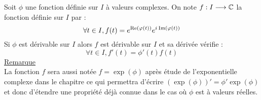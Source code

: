 \begin{appl}
	Soit \(\phi\) une fonction définie sur \(I\) à valeurs complexes.
	On note \(f : I \longrightarrow \mathbb{C}\) la fonction définie sur \(I\) par :
	\[\forall t \in I, f(t) = e^{\operatorname{Re}\left(\varphi(t)\right)}e^{i\mkern1mu\operatorname{Im}\left(\varphi(t)\right)}\]
	Si \(\phi\) est dérivable sur \(I\) alors \(f\) est dérivable sur \(I\) et sa dérivée vérifie :
	\[\forall t \in I,f'(t) = \phi '(t)f(t) \]
	\underline{Remarque} \\
	La fonction \(f\) sera aussi notée \(f = \exp(\phi)\) après étude de l’exponentielle complexe dans le chapitre  ce qui permettra d’écrire \((\exp(\phi))' = \phi' \exp(\phi)\) et donc d’étendre une propriété déjà connue dans le cas où \(\phi\) est à valeurs réelles.
\end{appl}